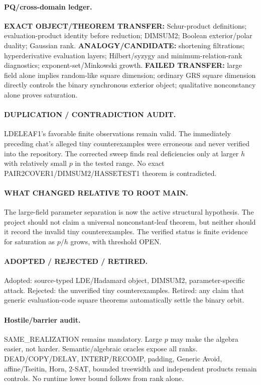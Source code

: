 \documentclass[11pt]{article}
\begin{document}
\paragraph{PQ/cross-domain ledger.}
\textbf{EXACT OBJECT/THEOREM TRANSFER:} Schur-product definitions; evaluation-product identity before reduction; DIMSUM2; Boolean exterior/polar duality; Gaussian rank.
\textbf{ANALOGY/CANDIDATE:} shortening filtrations; hyperderivative evaluation layers; Hilbert/syzygy and minimum-relation-rank diagnostics; exponent-set/Minkowski growth.
\textbf{FAILED TRANSFER:} large field alone implies random-like square dimension; ordinary GRS square dimension directly controls the binary synchronous exterior object; qualitative nonconstancy alone proves saturation.

\paragraph{DUPLICATION / CONTRADICTION AUDIT.}
LDELEAF1's favorable finite observations remain valid. The immediately preceding chat's alleged tiny counterexamples were erroneous and never verified into the repository. The corrected sweep finds real deficiencies only at larger $h$ with relatively small $p$ in the tested range. No exact PAIR2COVER1/DIMSUM2/HASSETEST1 theorem is contradicted.

\paragraph{WHAT CHANGED RELATIVE TO ROOT MAIN.}
The large-field parameter separation is now the active structural hypothesis. The project should not claim a universal nonconstant-leaf theorem, but neither should it record the invalid tiny counterexamples. The verified status is finite evidence for saturation as $p/h$ grows, with threshold OPEN.

\paragraph{ADOPTED / REJECTED / RETIRED.}
Adopted: source-typed LDE/Hadamard object, DIMSUM2, parameter-specific attack.
Rejected: the unverified tiny counterexamples.
Retired: any claim that generic evaluation-code square theorems automatically settle the binary orbit.

\paragraph{Hostile/barrier audit.}
SAME_REALIZATION remains mandatory. Large $p$ may make the algebra easier, not harder. Semantic/algebraic oracles expose all ranks. DEAD/COPY/DELAY, INTERP/RECOMP, padding, Generic Avoid, affine/Tseitin, Horn, 2-SAT, bounded treewidth and independent products remain controls. No runtime lower bound follows from rank alone.
\end{document}
